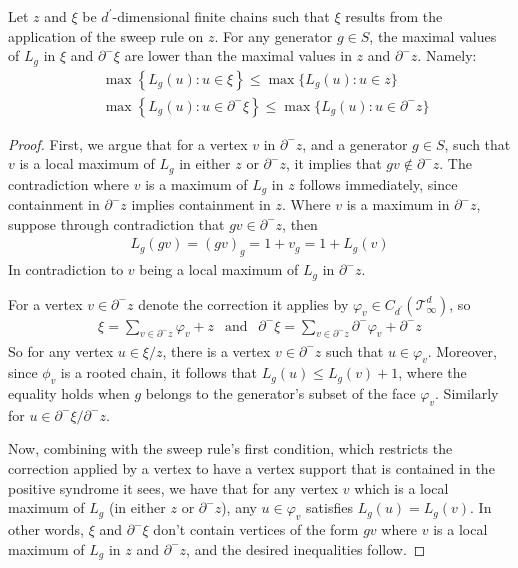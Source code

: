 \begin{claim}
  \label{claim:edge_pole}
Let $z$ and $\xi$ be $d^{\prime}$-dimensional finite chains such that $\xi$ results from the application of the sweep rule on $z$.
For any generator $g \in S$, the maximal values of $L_{g}$ in $\xi$ and $\partial^{-} \xi$ are lower than the maximal values in $z$ and $\partial^{-} z$. Namely:
\begin{equation*}
  \begin{split}
    & \max \left\{ L_{g}(u) : u \in \xi \right\}  \le  \max \big\{ L_{g}(u) : u \in z \big\} \\
    & \max \left\{ L_{g}(u) : u \in \partial^{-} \xi \right\}  \le  \max \big\{ L_{g}(u) : u \in \partial^{-} z \big\} 
  \end{split}
\end{equation*}

\end{claim}
\begin{proof}
  First, we argue that for a vertex $v$ in $\partial^{-} z$, and a generator $g \in S$, such that $v$ is a local maximum of $L_{g}$ in either $z$ or $\partial^{-} z$, it implies that $gv \notin \partial^{-} z$. The contradiction where $v$ is a maximum of $L_{g}$ in $z$ follows immediately, since containment in $\partial^{-} z$ implies containment in $z$. Where $v$ is a maximum in $\partial^{-} z$, suppose through contradiction that $gv \in \partial^{-} z$, then
  \begin{equation*}
    \begin{split}
      L_{g}(gv) = (gv)_{g} = 1 + v_{g} = 1 + L_{g}(v)
    \end{split}
  \end{equation*}
In contradiction to $v$ being a local maximum of $L_{g}$ in $\partial^{-} z$.

For a vertex $v \in \partial^{-}z$ denote the correction it applies by $\varphi_{v} \in C_{d^{\prime}}(\mathcal T_\infty^d) $, so 
\begin{equation*}
  \begin{split}
    \xi = \sum_{v \in \partial^{-}z}\varphi_{v} + z \ \ \text{ and } \ \ \partial^{-}\xi = \sum_{v \in \partial^{-}z}\partial^{-}\varphi_{v} + \partial^{-}z
  \end{split}
\end{equation*}
So for any vertex $u \in \xi/z$, there is a vertex $v \in \partial^{-}z$ such that $u \in \varphi_{v}$. Moreover, since $\phi_{v}$ is a rooted chain, it follows that $L_{g}(u) \le L_{g}(v) + 1$, where the equality holds when $g$ belongs to the generator's subset of the face $\varphi_{v}$. Similarly for $u \in \partial^{-}\xi/\partial^{-}z$. 

Now, combining with the sweep rule's first condition, which restricts the correction applied by a vertex to have a vertex support that is contained in the positive syndrome it sees, we have that for any vertex $v$ which is a local maximum of $L_{g}$ (in either $z$ or $\partial^{-}z$), any $u \in \varphi_{v}$ satisfies $L_{g}(u) = L_{g}(v)$. In other words, $\xi$ and $\partial^{-}\xi$ don't contain vertices of the form $gv$ where $v$ is a local maximum of $L_{g}$ in $z$ and $\partial^{-}z$, and the desired inequalities follow.
\end{proof}



